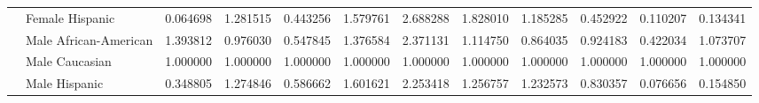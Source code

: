 \begin{tabular}{llrrrrrrrrrr}
    & Female Hispanic &       0.064698 &       1.281515 &       0.443256 &             1.579761 &       2.688288 &       1.828010 &         1.185285 &       0.452922 &       0.110207 &       0.134341 \\
    & Male African-American &       1.393812 &       0.976030 &       0.547845 &             1.376584 &       2.371131 &       1.114750 &         0.864035 &       0.924183 &       0.422034 &       1.073707 \\
    & Male Caucasian &       1.000000 &       1.000000 &       1.000000 &             1.000000 &       1.000000 &       1.000000 &         1.000000 &       1.000000 &       1.000000 &       1.000000 \\
    & Male Hispanic &       0.348805 &       1.274846 &       0.586662 &             1.601621 &       2.253418 &       1.256757 &         1.232573 &       0.830357 &       0.076656 &       0.154850 \\
\bottomrule
\end{tabular}
